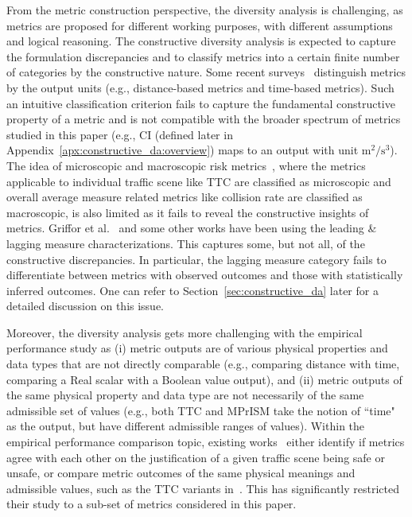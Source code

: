 \documentclass[journal]{IEEEtran}
\begin{document}
From the metric construction perspective, the diversity analysis is challenging, as metrics are proposed for different working purposes, with different assumptions and logical reasoning. The constructive diversity analysis is expected to capture the formulation discrepancies and to classify metrics into a certain finite number of categories by the constructive nature. Some recent surveys~\cite{elli2021evaluation,jammula2022evaluation} distinguish metrics by the output units (e.g., distance-based metrics and time-based metrics). Such an intuitive classification criterion fails to capture the fundamental constructive property of a metric and is not compatible with the broader spectrum of metrics studied in this paper (e.g., CI (defined later in Appendix~\ref{apx:constructive_da:overview}) maps to an output with unit $\mathrm{m^2/s^3}$). The idea of microscopic and macroscopic risk metrics~\cite{junietz2019microscopic}, where the metrics applicable to individual traffic scene like TTC are classified as microscopic and overall average measure related metrics like collision rate are classified as macroscopic, is also limited as it fails to reveal the constructive insights of metrics. Griffor et al.~\cite{griffor2019workshop} and some other works have been using the leading \& lagging measure characterizations. This captures some, but not all, of the constructive discrepancies. In particular, the lagging measure category fails to differentiate between metrics with observed outcomes and those with statistically inferred outcomes. One can refer to Section~\ref{sec:constructive_da} later for a detailed discussion on this issue.

Moreover, the diversity analysis gets more challenging with the empirical performance study as (i) metric outputs are of various physical properties and data types that are not directly comparable (e.g., comparing distance with time, comparing a Real scalar with a Boolean value output), and (ii) metric outputs of the same physical property and data type are not necessarily of the same admissible set of values (e.g., both TTC and MPrISM take the notion of ``time" as the output, but have different admissible ranges of values). Within the empirical performance comparison topic, existing works~\cite{kidambi2022sensitivity,mattas2022driver} either identify if metrics agree with each other on the justification of a given traffic scene being safe or unsafe, or compare metric outcomes of the same physical meanings and admissible values, such as the TTC variants in~\cite{kidambi2022sensitivity}. This has significantly restricted their study to a sub-set of metrics considered in this paper.
\end{document}
